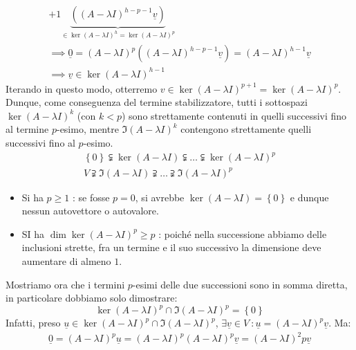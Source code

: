 \begin{demonstration}
\begin{enumerate}[label=\Roman*]
\begin{equation*}
\begin{array}{l}
{+1}\underbrace{\left(\left(A-\lambda I\right)^{h-p-1}\underline{v}\right)}_{\in \ker \left(A-\lambda I\right)^h=\ker\left(A-\lambda I\right)^p}\\
\implies\underline{0}=\left(A-\lambda I\right)^p\left(\left(A-\lambda I\right)^{h-p-1}\underline{v}\right)=\left(A-\lambda I\right)^{h-1}\underline{v}\\
\implies \underline{v}\in\ker \left(A-\lambda I\right)^{h-1}
	\end{array}
\end{equation*}
Iterando in questo modo, otterremo $v\in\ker\left(A-\lambda I\right)^{p+1}=\ker\left(A-\lambda I\right)^{p}$. Dunque, come conseguenza del termine stabilizzatore, tutti i sottospazi $\ker \left(A-\lambda I\right)^k$ (con $k<p$) sono strettamente contenuti in quelli successivi fino al termine $p$-esimo, mentre $\Im \left(A-\lambda I\right)^k$ contengono strettamente quelli successivi fino al $p$-esimo.
\begin{gather}\label{successionejordan}
\left\{0\right\}\subsetneqq \ker \left(A-\lambda I\right)\subsetneqq\ldots\subsetneqq\ker \left(A-\lambda I\right)^p\\
V\supsetneqq \Im \left(A-\lambda I\right)\supsetneqq\ldots\supsetneqq\Im \left(A-\lambda I\right)^p
\end{gather}
\begin{itemize}
\item Si ha $p\geq 1$ : se fosse $p=0$, si avrebbe $\ker \left(A-\lambda I\right)=\left\{0\right\}$ e dunque nessun autovettore o autovalore.
\item SI ha $\dim \ker\left(A-\lambda I\right)^p\geq p$ : poiché nella successione abbiamo delle inclusioni strette, fra un termine e il suo successivo la dimensione deve aumentare di almeno $1$.
\end{itemize}
Mostriamo ora che i termini $p$-esimi delle due successioni sono in somma diretta, in particolare dobbiamo solo dimostrare:
\begin{equation*}
	\ker\left(A-\lambda I\right)^p\cap\Im\left(A-\lambda I\right)^p=\left\{0\right\}
\end{equation*}
Infatti, preso $\underline{u}\in\ker\left(A-\lambda I\right)^p\cap\Im\left(A-\lambda I\right)^p$, $\exists\underline{v}\in V\ \colon \underline{u}=\left(A-\lambda I\right)^p\underline{v}$. Ma:
\begin{equation*}
\begin{array}{l}
	\underline{0}=\left(A-\lambda I\right)^p\underline{u}=\left(A-\lambda I\right)^p\left(A-\lambda I\right)^p\underline{v}=\left(A-\lambda I\right)^2p\underline {v}\\

\end{array}
\end{equation*}
\end{enumerate}
\end{demonstration}

